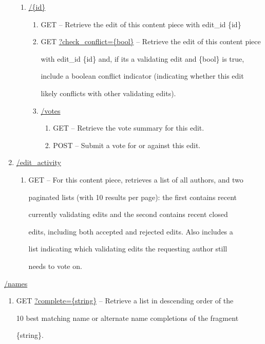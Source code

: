 \documentclass[12pt,letterpaper]{article}
\begin{document}
\begin{myEnumerate}
\begin{myEnumerate}
\begin{myEnumerate}
\begin{enumerate}
\begin{enumerate}
\item[] \url{/{id}}
\begin{enumerate}
\item[] GET -- Retrieve the edit of this content piece with edit\_id \{id\}
\item[] GET \url{?check_conflict={bool}} -- Retrieve the edit of this content piece \par with edit\_id \{id\} and, if its a validating edit and \{bool\} is true, \par include a boolean conflict indicator (indicating whether this edit \par likely conflicts with other validating edits). %
\item[] \url{/votes}
\begin{enumerate}
\item[] GET -- Retrieve the vote summary for this edit.
\item[] POST -- Submit a vote for or against this edit.
\end{enumerate}
\end{enumerate}
\end{enumerate}
\item[] \url{/edit_activity}
\begin{enumerate}
\item[] GET -- For this content piece, retrieves a list of all authors, and two \par paginated lists (with 10 results per page): the first contains recent \par currently validating edits and the second contains recent closed \par edits, including both accepted and rejected edits. Also includes a \par list indicating which validating edits the requesting author still \par needs to vote on.
\end{enumerate}
\end{enumerate}
\item[] \url{/names}
\begin{enumerate}
\item[] GET \url{?complete={string}} -- Retrieve a list in descending order of the \par 10 best matching name or alternate name completions of the fragment \par \{string\}.
\end{enumerate}

\end{myEnumerate}
\end{myEnumerate}
\end{myEnumerate}
\end{document}
